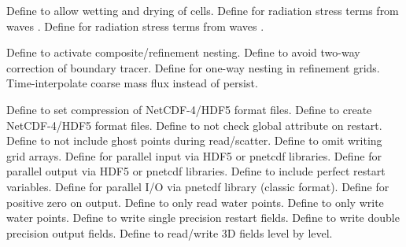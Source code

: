 \begin{klist}
   \mbox{}
  \begin{klist}
     Define to allow wetting and drying of cells.
     Define for radiation stress terms from
    waves \citep{Mellor_2005}.
     Define for radiation stress terms from
    waves \citep{Mellor_2008}.
  \end{klist}
   \mbox{}
  \begin{klist}
      Define to activate composite/refinement nesting.
     Define to avoid two-way correction
  of boundary tracer.
     Define for one-way nesting in refinement grids.
     Time-interpolate coarse mass flux
  instead of persist.
  \end{klist}
   \mbox{}
  \begin{klist}
     Define to set compression of NetCDF-4/HDF5 format files.
     Define to create NetCDF-4/HDF5 format files.
     Define to not check  global
    attribute on restart.
     Define to not include ghost points during
    read/scatter.
     Define to omit writing grid arrays.
     Define for parallel input via HDF5 or pnetcdf
    libraries.
     Define for parallel output via HDF5 or pnetcdf
    libraries.
     Define to include perfect restart variables.
     Define for parallel I/O via pnetcdf library
    (classic format).
     Define for positive zero on output.
     Define to only read water points.
     Define to only write water points.
     Define to write single precision restart fields.
     Define to write double precision output fields.
     Define to read/write 3D fields level by level.
  \end{klist}
\end{klist}

